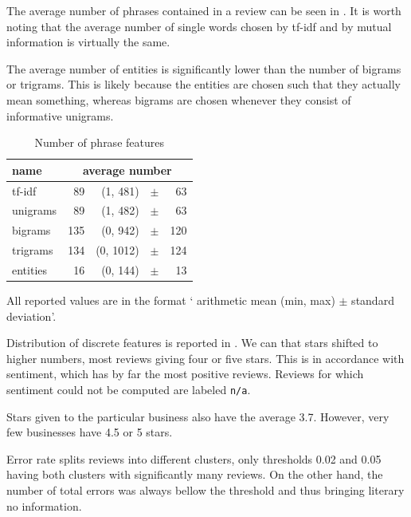 The average number of phrases contained in a review can be seen in .
It is worth noting that the average number of single words chosen by tf-idf and by mutual information is virtually the same.

The average number of entities is significantly lower than the number of bigrams or trigrams.
This is likely because the entities are chosen such that they actually mean something,
whereas bigrams are chosen whenever they consist of informative unigrams.
\begin{table}[h!]
\centering
\begin{tabular}{lr@{~}r@{~}r@{~}r}
\toprule
\textbf{name}	& \multicolumn{4}{c}{\textbf{average number}} \\
\midrule
tf-idf  & 89 & (1, 481) & $\pm$& 63 \\
unigrams & 89 & (1, 482) & $\pm$& 63 \\
bigrams & 135 & (0, 942) & $\pm$ &120 \\
trigrams & 134 & (0, 1012) & $\pm$& 124 \\
entities & 16 & (0, 144) & $\pm$ &13 \\
\bottomrule
\end{tabular}


\caption{Number of phrase features}\label{tab:phrase_feat_nu}
All reported values are in the format ` arithmetic mean (min, max) $\pm$ standard deviation'.
\end{table}


Distribution of discrete features is reported in .
We can that stars shifted to higher numbers, most reviews giving
four or five stars.
This is in accordance with sentiment, which has by far the most positive reviews.
Reviews for which sentiment could not be computed are labeled \texttt{n/a}.

Stars given to the particular business also have the average 3.7.
However, very few businesses have 4.5 or 5 stars.

Error rate splits reviews into different clusters, only thresholds 0.02 and 0.05
having both clusters with significantly many reviews.
On the other hand, the number of total errors was always bellow the threshold and 
thus bringing literary no information.

